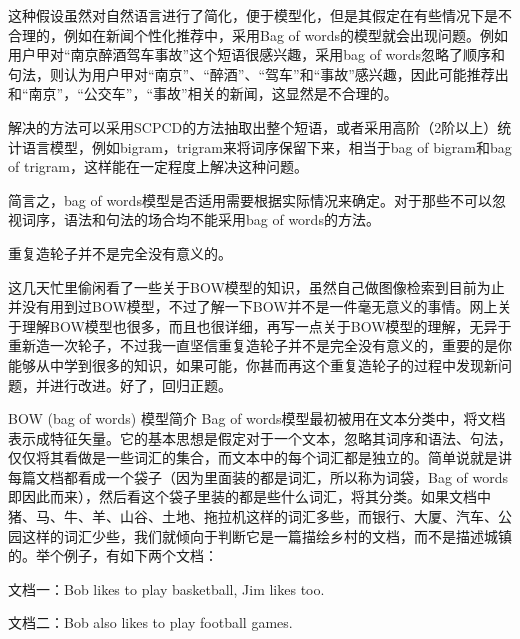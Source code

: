 \documentclass[10pt,a4paper]{ctexbook}
\begin{document}
             这种假设虽然对自然语言进行了简化，便于模型化，但是其假定在有些情况下是不合理的，例如在新闻个性化推荐中，采用Bag of words的模型就会出现问题。例如用户甲对“南京醉酒驾车事故”这个短语很感兴趣，采用bag of words忽略了顺序和句法，则认为用户甲对“南京”、“醉酒”、“驾车”和“事故”感兴趣，因此可能推荐出和“南京”，“公交车”，“事故”相关的新闻，这显然是不合理的。
              
                   解决的方法可以采用SCPCD的方法抽取出整个短语，或者采用高阶（2阶以上）统计语言模型，例如bigram，trigram来将词序保留下来，相当于bag of bigram和bag of trigram，这样能在一定程度上解决这种问题。
                    
                        简言之，bag of words模型是否适用需要根据实际情况来确定。对于那些不可以忽视词序，语法和句法的场合均不能采用bag of words的方法。
                         









重复造轮子并不是完全没有意义的。

 

 

这几天忙里偷闲看了一些关于BOW模型的知识，虽然自己做图像检索到目前为止并没有用到过BOW模型，不过了解一下BOW并不是一件毫无意义的事情。网上关于理解BOW模型也很多，而且也很详细，再写一点关于BOW模型的理解，无异于重新造一次轮子，不过我一直坚信重复造轮子并不是完全没有意义的，重要的是你能够从中学到很多的知识，如果可能，你甚而再这个重复造轮子的过程中发现新问题，并进行改进。好了，回归正题。

 

BOW (bag of words) 模型简介
Bag of words模型最初被用在文本分类中，将文档表示成特征矢量。它的基本思想是假定对于一个文本，忽略其词序和语法、句法，仅仅将其看做是一些词汇的集合，而文本中的每个词汇都是独立的。简单说就是讲每篇文档都看成一个袋子（因为里面装的都是词汇，所以称为词袋，Bag of words即因此而来），然后看这个袋子里装的都是些什么词汇，将其分类。如果文档中猪、马、牛、羊、山谷、土地、拖拉机这样的词汇多些，而银行、大厦、汽车、公园这样的词汇少些，我们就倾向于判断它是一篇描绘乡村的文档，而不是描述城镇的。举个例子，有如下两个文档：

 

文档一：Bob likes to play basketball, Jim likes too.

文档二：Bob also likes to play football games.
\end{document}
